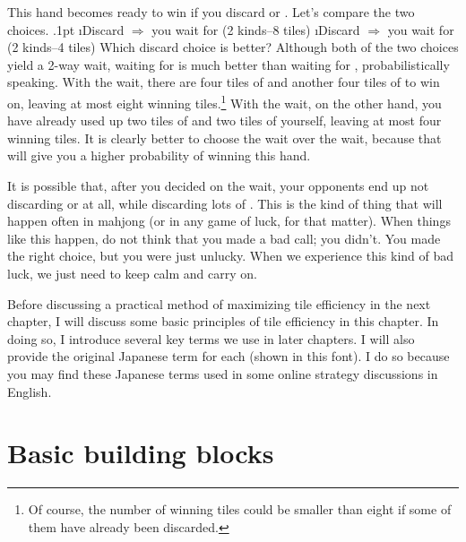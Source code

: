 \bigskip
\noindent
This hand becomes ready to win if you discard {\LARGE{}} or {\LARGE{}}. Let's compare the two choices.
\bi\itemsep.1pt
\i Discard {\LARGE{}} \hspace{5pt} $\Rightarrow$ you wait for {\LARGE{} } (2 kinds--8 tiles)
\i Discard {\LARGE{}} \hspace{5pt} $\Rightarrow$ you wait for {\LARGE{}} {\LARGE{}} (2 kinds--4 tiles)
\ei
Which discard choice is better? Although both of the two choices yield a 2-way wait, waiting for {\LARGE{} } is much better than waiting for {\LARGE{}} {\LARGE{}}, probabilistically speaking. With the {\LARGE{} } wait, there are four tiles of {\LARGE{}} and another four tiles of {\LARGE{}} to win on, leaving at most eight winning tiles.\footnote{Of course, the number of winning tiles could be smaller than eight if some of them have already been discarded.} 
With the {\LARGE{}} {\LARGE{}} wait, on the other hand, you have already used up two tiles of {\LARGE{}} and two tiles of {\LARGE{}} yourself, leaving at most four winning tiles. It is clearly better to choose the {\LARGE{} } wait over the {\LARGE{}} {\LARGE{}} wait, because that will give you a higher probability of winning this hand. 

\bigskip
It is possible that, after you decided on the {\LARGE{} } wait, your opponents end up not discarding {\LARGE{}} or {\LARGE{}} at all, while discarding lots of {\LARGE{} }. This is the kind of thing that will happen often in mahjong (or in any game of luck, for that matter). When things like this happen, do not think that you made a bad call; you didn't. You made the right choice, but you were just unlucky. When we experience this kind of bad luck, we just need to keep calm and carry on. 

\bigskip
Before discussing a practical method of maximizing tile efficiency in the next chapter, I will discuss some basic principles of tile efficiency in this chapter. In doing so, I introduce several key terms we use in later chapters. I will also provide the original Japanese term for each (shown in {\jap this font}). I do so because you may find these Japanese terms used in some online strategy discussions in English.

\section{Basic building blocks}

